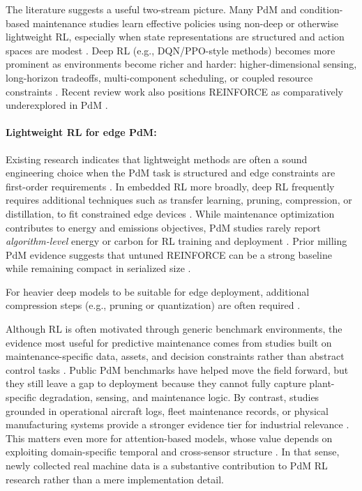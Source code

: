 \documentclass[sn-basic]{sn-jnl} %
\begin{document}
The literature suggests a useful two-stream picture. Many PdM and condition-based maintenance studies learn effective policies using non-deep or otherwise lightweight RL, especially when state representations are structured and action spaces are modest \cite{Adsule2020, Yousefi2020, Rasay2024, Dadash2024}. Deep RL (e.g., DQN/PPO-style methods) becomes more prominent as environments become richer and harder: higher-dimensional sensing, long-horizon tradeoffs, multi-component scheduling, or coupled resource constraints \cite{Liu2020, Chen2023, Lee2022, Ong2022-02}. Recent review work also positions \textsc{REINFORCE} as comparatively underexplored in PdM \cite{Siraskar2025}.

\paragraph{Lightweight RL for edge PdM:}
Existing research indicates that lightweight methods are often a sound engineering choice when the PdM task is structured and edge constraints are first-order requirements \cite{Compare2020, Njor2024, Pandey2023}. In embedded RL more broadly, deep RL frequently requires additional techniques such as transfer learning, pruning, compression, or distillation, to fit constrained edge devices \cite{Jang2020, Szydlo2022, Xu2022}.
While maintenance optimization contributes to energy and emissions objectives, PdM studies rarely report \emph{algorithm-level} energy or carbon for RL training and deployment \cite{Banyai2021, Banyai2022, JasiulewiczKaczmarek2024}. Prior milling PdM evidence suggests that untuned \textsc{REINFORCE} can be a strong baseline while remaining compact in serialized size \cite{Siraskar2025}.

For heavier deep models to be suitable for edge deployment, additional compression steps (e.g., pruning or quantization) are often required \cite{Pandey2023, Jang2020, Xu2022}.

Although RL is often motivated through generic benchmark environments, the evidence most useful for predictive maintenance comes from studies built on maintenance-specific data, assets, and decision constraints rather than abstract control tasks \cite{Andrade2021Aircraft,Dangut2022RareFailure,Zhao2024,Siraskar2025}. Public PdM benchmarks have helped move the field forward, but they still leave a gap to deployment because they cannot fully capture plant-specific degradation, sensing, and maintenance logic. By contrast, studies grounded in operational aircraft logs, fleet maintenance records, or physical manufacturing systems provide a stronger evidence tier for industrial relevance \cite{Andrade2021Aircraft,Dangut2022RareFailure,Chen2024DigitalTwin}. This matters even more for attention-based models, whose value depends on exploiting domain-specific temporal and cross-sensor structure \cite{Zhao2024}. In that sense, newly collected real machine data is a substantive contribution to PdM RL research rather than a mere implementation detail.
\end{document}
